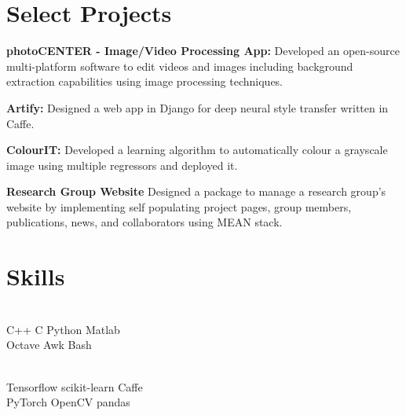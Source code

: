 \documentclass[US paper]{deedy-resume} %
\begin{document}
{\vspace{1mm}

\vspace{-5pt}

\section{Select Projects}

\vspace{5pt}
\begin{tightitemize}
\item \textbf{photoCENTER - Image/Video Processing App:} Developed an open-source multi-platform software to edit videos and images including background extraction capabilities using image processing techniques. \vspace{0.5mm}
\item \textbf{Artify:} Designed a web app in Django for deep neural style transfer written in Caffe.
\vspace{0.5mm}
\item \textbf{ColourIT:} Developed a learning algorithm to automatically colour a grayscale image using multiple regressors and deployed it. \vspace{0.5mm}
\item \textbf{Research Group Website} Designed a package to manage a research group's website by implementing self populating project pages, group members, publications, news, and collaborators using MEAN stack.
\end{tightitemize}


\vspace{-3pt}
\sectionspace %


\vspace{-5pt}
\section{Skills}
\vspace{-10pt}
\begin{multicols}{4}
[
]
 \\
C++ \textbullet{} C \textbullet{} Python \textbullet{} Matlab \\
 \textbullet{} Octave \textbullet{} Awk \textbullet{} Bash 


\columnbreak

 \\
Tensorflow  \textbullet{} scikit-learn \textbullet{} Caffe \\\textbullet{} PyTorch \textbullet{} OpenCV \textbullet{} pandas \\


\end{multicols}}
\end{document}
